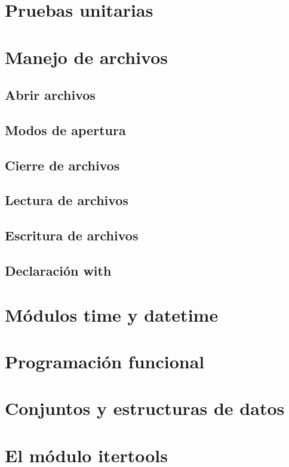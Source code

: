 \documentclass{article}
\begin{document}
    \section{Pruebas unitarias}

    \section{Manejo de archivos}

      \subsection{Abrir archivos}
      \subsection{Modos de apertura}
      \subsection{Cierre de archivos}
      \subsection{Lectura de archivos}
      \subsection{Escritura de archivos}
      \subsection{Declaración with}

    \section{Módulos time y datetime}

    \section{Programación funcional}

    \section{Conjuntos y estructuras de datos}

    \section{El módulo itertools}
\end{document}
